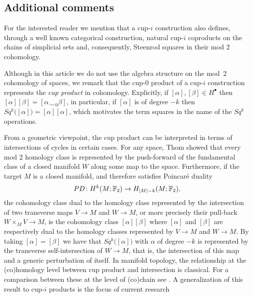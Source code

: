 \subsection{Additional comments}

\begin{remark}
	For the interested reader we mention that a cup-$i$ construction also defines, through a well known categorical construction, natural cup-$i$ coproducts on the chains of simplicial sets \cite{friedman2012simplicial} and, consequently, Steenrod squares in their mod 2 cohomology.
\end{remark}

\begin{remark} \label{r:cup product}
	Although in this article we do not use the algebra structure on the mod~2 cohomology of spaces, we remark that the cup-$0$ product of a cup-$i$ construction represents the \textit{cup product} in cohomology.
	Explicitly, if $[\alpha], [\beta] \in H^\bullet$ then $[\alpha][\beta] = [\alpha \smallsmile_0 \beta]$, in particular, if $[\alpha]$ is of degree $-k$ then $Sq^k\big([\alpha]\big) = [\alpha] [\alpha]$, which motivates the term squares in the name of the $Sq^k$ operations.
\end{remark}

\begin{remark}
	From a geometric viewpoint, the cup product can be interpreted in terms of intersections of cycles in certain cases.
	For any space, Thom showed that every mod $2$ homology class is represented by the push-forward of the fundamental class of a closed manifold $W$ along some map to the space.
	Furthermore, if the target $M$ is a closed manifold, and therefore satisfies Poincar\'{e} duality
	\[
	PD \colon H^k(M ;{\mathbb{F}_2}) \to H_{\lvert M\rvert-k}(M; {\mathbb{F}_2}),
	\]
	the cohomology class dual to the homology class represented by the intersection of two transverse maps $V \to M$ and $W \to M$, or more precisely their pull-back $W \times_M V \to M$, is the cohomology class $[\alpha] [\beta]$ where $[\alpha]$ and $[\beta]$ are respectively dual to the homology classes represented by $V \to M$ and $W \to M$.
	By taking $[\alpha] = [\beta]$ we have that $Sq^k \big( [\alpha] \big)$ with $\alpha$ of degree $-k$ is represented by the transverse self-intersection of $W \to M$, that is, the intersection of this map and a generic perturbation of itself.
	In manifold topology, the relationship at the (co)homology level between cup product and intersection is classical.
	For a comparison between these at the level of (co)chain see \cite{medina2021flowing}.
	A generalization of this result to cup-$i$ products is the focus of current research \cite{medina2022foundations}
\end{remark}

